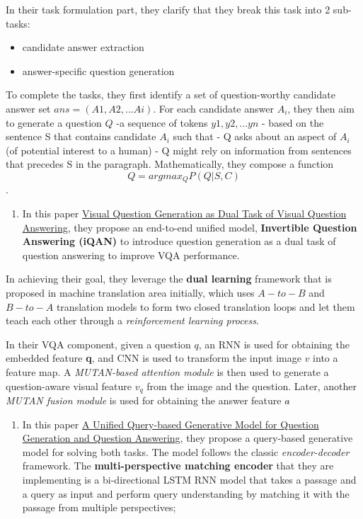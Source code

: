 \documentclass[]{book}
\providecommand{\tightlist}{%
  \setlength{\itemsep}{0pt}\setlength{\parskip}{0pt}}
\theoremstyle{definition}
\theoremstyle{definition}
\theoremstyle{definition}
\theoremstyle{remark}
\begin{document}
In their task formulation part, they clarify that they break this task
into 2 sub-tasks:

\begin{itemize}
\tightlist
\item
  candidate answer extraction
\item
  answer-specific question generation
\end{itemize}

To complete the tasks, they first identify a set of question-worthy
candidate answer set \(ans = (A1, A2,...Ai)\). For each candidate answer
\(A_i\), they then aim to generate a question \(Q\) -a sequence of
tokens \({y1,y2,...yn}\) - based on the sentence S that contains
candidate \(A_i\) such that - Q asks about an aspect of \(A_i\) (of
potential interest to a human) - Q might rely on information from
sentences that precedes S in the paragraph. Mathematically, they compose
a function \[Q = argmax_Q P(Q|S,C)\].

\begin{enumerate}
\def\labelenumi{\arabic{enumi}.}
\setcounter{enumi}{2}
\tightlist
\item
  In this paper
  \href{http://cvboy.com/pdf/publications/cvpr2018_iqan.pdf}{Visual
  Question Generation as Dual Task of Visual Question Answering}, they
  propose an end-to-end unified model, \textbf{Invertible Question
  Answering (iQAN)} to introduce question generation as a dual task of
  question answering to improve VQA performance.
\end{enumerate}

In achieving their goal, they leverage the \textbf{dual learning}
framework that is proposed in machine translation area initially, which
uses \(A-to-B\) and \(B-to-A\) translation models to form two closed
translation loops and let them teach each other through a
\emph{reinforcement learning process}.

In their VQA component, given a question \(q\), an RNN is used for
obtaining the embedded feature \textbf{q}, and CNN is used to transform
the input image \(v\) into a feature map. A \emph{MUTAN-based attention
module} is then used to generate a question-aware visual feature \(v_q\)
from the image and the question. Later, another \emph{MUTAN fusion
module} is used for obtaining the answer feature \(a\hat{}\)

\begin{enumerate}
\def\labelenumi{\arabic{enumi}.}
\setcounter{enumi}{3}
\tightlist
\item
  In this paper \href{https://arxiv.org/pdf/1709.01058.pdf}{A Unified
  Query-based Generative Model for Question Generation and Question
  Answering}, they propose a query-based generative model for solving
  both tasks. The model follows the classic \emph{encoder-decoder}
  framework. The \textbf{multi-perspective matching encoder} that they
  are implementing is a bi-directional LSTM RNN model that takes a
  passage and a query as input and perform query understanding by
  matching it with the passage from multiple perspectives;
\end{enumerate}
\end{document}
